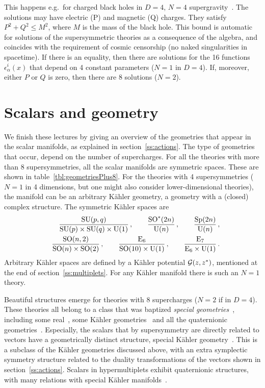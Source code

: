 \documentclass[a4paper,11pt,twoside]{article}
\newcommand{\OliveGreen}[1]{#1}
\newcommand{\SU}{\mathop{\rm SU}}
\newcommand{\SO}{\mathop{\rm SO}}
\newcommand{\U}{\mathop{\rm {}U}}
\newcommand{\Symp}{\mathop{\rm {}Sp}}
\begin{document}
This happens e.g.\ for charged black holes in $D=4$, $N=4$
supergravity~\cite{Kallosh:1992ii}. The solutions may have electric (P)
and magnetic (Q) charges. They satisfy $P^2+Q^2\leq M^2$, where $M$ is
the mass of the black hole. This bound is automatic for solutions of the
supersymmetric theories as a consequence of the algebra, and coincides
with the requirement of cosmic censorship (no naked singularities in
spacetime). If there is an equality, then there are solutions for the 16
functions $\OliveGreen{\epsilon^i_\alpha} (x)$ that depend on 4 constant
parameters ($N=1$ in $D=4$). If, moreover, either $P$ or $Q$ is zero,
then there are 8 solutions ($N=2$).


\section{Scalars and geometry} \label{ss:scalGeom}

We finish these lectures by giving an overview of the geometries that
appear in the scalar manifolds, as explained in section~\ref{ss:actions}.
The type of geometries that occur, depend on the number of supercharges.
For all the theories with more than 8 supersymmetries, all the scalar
manifolds are symmetric spaces. These are shown in
table~\ref{tbl:geometriesPlus8}. For the theories with 4 supersymmetries
($N=1$ in 4 dimensions, but one might also consider lower-dimensional
theories), the manifold can be an arbitrary K{\"a}hler geometry, a geometry
with a (closed) complex structure. The symmetric K{\"a}hler spaces are
\begin{eqnarray}
&&\frac{\SU(p,q)}{\SU(p)\times \SU(q)\times \U(1)}  \,,\qquad
\frac{\SO^*(2n)}{\U(n)}\,,\qquad \frac{\Symp(2n)}{\U(n)}\,, \nonumber\\
&& \frac{\SO(n,2)}{\SO(n)\times \SO(2)}\,,\qquad
\frac{\mathrm{E}_6}{\SO(10)\times \U(1)} \,,\qquad
\frac{\mathrm{E}_7}{\mathrm{E}_6\times \U(1)}\,.
 \label{symmKahler}
\end{eqnarray}
Arbitrary K{\"a}hler spaces are defined by a K{\"a}hler potential ${\cal
G}(z,z^*)$, mentioned at the end of section~\ref{ss:multiplets}. For any
K{\"a}hler manifold there is such an $N=1$ theory.

Beautiful structures emerge for theories with 8 supercharges ($N=2$ if in
$D=4$). These theories all belong to a class that was baptized
\emph{special geometries}~\cite{Strominger:1990pd,deWit:1992cr},
including some real~\cite{Gunaydin:1984bi}, some K{\"a}hler
geometries~\cite{deWit:1984pk} and all the quaternionic
geometries~\cite{Bagger:1983tt}. Especially, the scalars that by
supersymmetry are directly related to vectors have a geometrically
distinct structure, special K{\"a}hler geometry~\cite{deWit:1984pk}. This is
a subclass of the K{\"a}hler geometries discussed above, with an extra
symplectic symmetry structure related to the duality transformations of
the vectors shown in section~\ref{ss:actions}. Scalars in hypermultiplets
exhibit quaternionic structures, with many relations with special K{\"a}hler
manifolds~\cite{Cecotti:1989qn,deWit:1993wf}.
\end{document}
